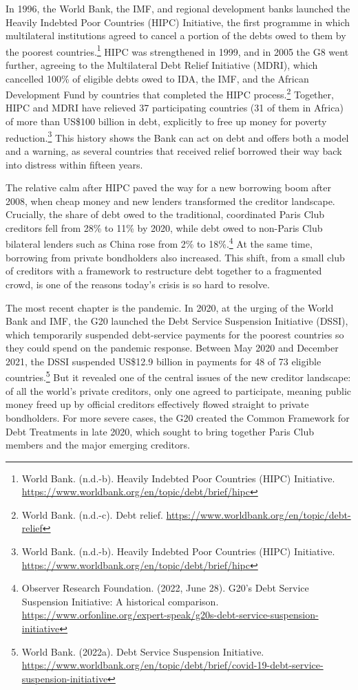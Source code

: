 In 1996, the World Bank, the IMF, and regional development banks launched the Heavily Indebted Poor Countries (HIPC) Initiative, the first programme in which multilateral institutions agreed to cancel a portion of the debts owed to them by the poorest countries.\footnote{World Bank. (n.d.-b). Heavily Indebted Poor Countries (HIPC) Initiative. \url{https://www.worldbank.org/en/topic/debt/brief/hipc}} HIPC was strengthened in 1999, and in 2005 the G8 went further, agreeing to the Multilateral Debt Relief Initiative (MDRI), which cancelled 100\% of eligible debts owed to IDA, the IMF, and the African Development Fund by countries that completed the HIPC process.\footnote{World Bank. (n.d.-c). Debt relief. \url{https://www.worldbank.org/en/topic/debt-relief}} Together, HIPC and MDRI have relieved 37 participating countries (31 of them in Africa) of more than US\$100 billion in debt, explicitly to free up money for poverty reduction.\footnote{World Bank. (n.d.-b). Heavily Indebted Poor Countries (HIPC) Initiative. \url{https://www.worldbank.org/en/topic/debt/brief/hipc}} This history shows the Bank can act on debt and offers both a model and a warning, as several countries that received relief borrowed their way back into distress within fifteen years.

The relative calm after HIPC paved the way for a new borrowing boom after 2008, when cheap money and new lenders transformed the creditor landscape. Crucially, the share of debt owed to the traditional, coordinated Paris Club creditors fell from 28\% to 11\% by 2020, while debt owed to non-Paris Club bilateral lenders such as China rose from 2\% to 18\%.\footnote{Observer Research Foundation. (2022, June 28). G20’s Debt Service Suspension Initiative: A historical comparison. \url{https://www.orfonline.org/expert-speak/g20s-debt-service-suspension-initiative}} At the same time, borrowing from private bondholders also increased. This shift, from a small club of creditors with a framework to restructure debt together to a fragmented crowd, is one of the reasons today’s crisis is so hard to resolve.

The most recent chapter is the pandemic. In 2020, at the urging of the World Bank and IMF, the G20 launched the Debt Service Suspension Initiative (DSSI), which temporarily suspended debt-service payments for the poorest countries so they could spend on the pandemic response. Between May 2020 and December 2021, the DSSI suspended US\$12.9 billion in payments for 48 of 73 eligible countries.\footnote{World Bank. (2022a). Debt Service Suspension Initiative. \url{https://www.worldbank.org/en/topic/debt/brief/covid-19-debt-service-suspension-initiative}} But it revealed one of the central issues of the new creditor landscape: of all the world’s private creditors, only one agreed to participate, meaning public money freed up by official creditors effectively flowed straight to private bondholders. For more severe cases, the G20 created the Common Framework for Debt Treatments in late 2020, which sought to bring together Paris Club members and the major emerging creditors.

